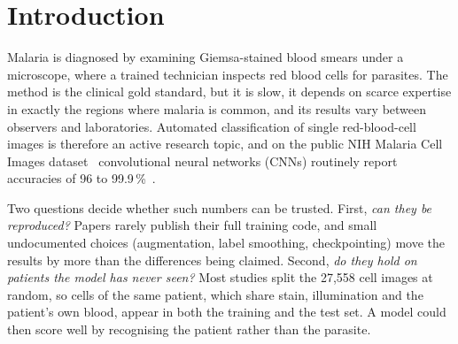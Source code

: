 \documentclass[conference]{IEEEtran}
\begin{document}
\section{Introduction}
Malaria is diagnosed by examining Giemsa-stained blood smears under a microscope, where a trained technician inspects red blood cells for parasites. The method is the clinical gold standard, but it is slow, it depends on scarce expertise in exactly the regions where malaria is common, and its results vary between observers and laboratories. Automated classification of single red-blood-cell images is therefore an active research topic, and on the public NIH Malaria Cell Images dataset~\cite{rajaraman2018} convolutional neural networks (CNNs) routinely report accuracies of 96 to 99.9\,\%~\cite{liang2016,rajaraman2018,rajaraman2019,umer2020,fuhad2020,zhao2020,masud2020,marques2022,madhu2023,hemachandran2023,mujahid2024}.

Two questions decide whether such numbers can be trusted. First, \emph{can they be reproduced?} Papers rarely publish their full training code, and small undocumented choices (augmentation, label smoothing, checkpointing) move the results by more than the differences being claimed. Second, \emph{do they hold on patients the model has never seen?} Most studies split the 27{,}558 cell images at random, so cells of the same patient, which share stain, illumination and the patient's own blood, appear in both the training and the test set. A model could then score well by recognising the patient rather than the parasite.
\end{document}

